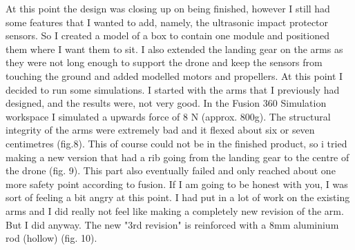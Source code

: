 \documentclass{hitec}
\begin{document}
\pagebreak
At this point the design was closing up on being finished, however I still had some features that I wanted to add, namely, the ultrasonic impact protector sensors. So I created a model of a box to contain one module and positioned them where I want them to sit. I also extended the landing gear on the arms as they were not long enough to support the drone and keep the sensors from touching the ground and added modelled motors and propellers.\newline
\newline
At this point I decided to run some simulations. I started with the arms that I previously had designed, and the results were, not very good. In the Fusion 360 Simulation workspace I simulated a upwards force of 8 N (approx. 800g). The structural integrity of the arms were extremely bad and it flexed about six or seven centimetres (fig.8). This of course could not be in the finished product, so i tried making a new version that had a rib going from the landing gear to the centre of the drone (fig. 9). This part also eventually failed and only reached about one more safety point according to fusion. \newline
If I am going to be honest with you, I was sort of feeling a bit angry at this point. I had put in a lot of work on the existing arms and I did really not feel like making a completely new revision of the arm. But I did anyway. The new "3rd revision" is reinforced with a 8mm aluminium rod (hollow) (fig. 10).
\end{document}
